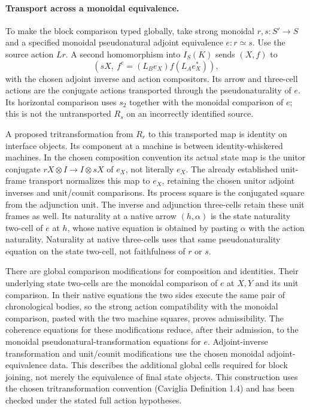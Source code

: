 \documentclass{article}
\begin{document}
\paragraph{Transport across a monoidal equivalence.} To make the block comparison typed globally, take strong monoidal $r,s:S'\to S$ and a specified monoidal pseudonatural adjoint equivalence $e:r\simeq s$. Use the source action $Lr$. A second homomorphism into $I_S(K)$ sends $(X,f)$ to
\[
 (sX,\ f^e=(L_Be_X)f(L_Ae_X^*)),
\]
with the chosen adjoint inverse and action compositors. Its arrow and three-cell actions are the conjugate actions transported through the pseudonaturality of $e$. Its horizontal comparison uses $s_2$ together with the monoidal comparison of $e$; this is not the untransported $R_s$ on an incorrectly identified source.

A proposed tritransformation from $R_r$ to this transported map is identity on interface objects. Its component at a machine is between identity-whiskered machines. In the chosen composition convention its actual state map is the unitor conjugate $rX\otimes I\to I\otimes sX$ of $e_X$, not literally $e_X$. The already established unit-frame transport normalizes this map to $e_X$, retaining the chosen unitor adjoint inverses and unit/counit comparisons. Its process square is the conjugated square from the adjunction unit. The inverse and adjunction three-cells retain these unit frames as well. Its naturality at a native arrow $(h,\alpha)$ is the state naturality two-cell of $e$ at $h$, whose native equation is obtained by pasting $\alpha$ with the action naturality. Naturality at native three-cells uses that same pseudonaturality equation on the state two-cell, not faithfulness of $r$ or $s$.

There are global comparison modifications for composition and identities. Their underlying state two-cells are the monoidal comparison of $e$ at $X,Y$ and its unit comparison. In their native equations the two sides execute the same pair of chronological bodies, so the strong action compatibility with the monoidal comparison, pasted with the two machine squares, proves admissibility. The coherence equations for these modifications reduce, after their admission, to the monoidal pseudonatural-transformation equations for $e$. Adjoint-inverse transformation and unit/counit modifications use the chosen monoidal adjoint-equivalence data. This describes the additional global cells required for block joining, not merely the equivalence of final state objects. This construction uses the chosen tritransformation convention (Caviglia Definition 1.4) and has been checked under the stated full action hypotheses.
\end{document}
